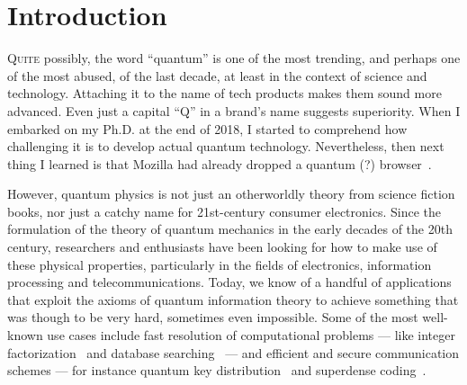 \chapter{Introduction}
\label{chp:intro}

\lettrine{Q}{uite} possibly, the word ``quantum'' is one of the most trending, and perhaps one of
the most abused, of the last decade, at least in the context of science and technology. Attaching it
to the name of tech products makes them sound more advanced. Even just a capital ``Q'' in a brand's
name suggests superiority. When I embarked on my Ph.D. at the end of 2018, I started to comprehend
how challenging it is to develop actual quantum technology. Nevertheless, then next thing I learned
is that Mozilla had already dropped a quantum (?) browser~\cite{firefox_quantum}.

However, quantum physics is not just an otherworldly theory from science fiction books, nor just a
catchy name for 21st-century consumer electronics. Since the formulation of the theory of quantum
mechanics in the early decades of the 20th century, researchers and enthusiasts have been looking
for how to make use of these physical properties, particularly in the fields of electronics,
information processing and telecommunications. Today, we know of a handful of applications that
exploit the axioms of quantum information theory to achieve something that was though to be very
hard, sometimes even impossible. Some of the most well-known use cases include fast resolution of
computational problems --- like integer factorization~\cite{shor_1994_algorithms} and database
searching~\cite{grover_1996_search} --- and efficient and secure communication schemes --- for
instance quantum key distribution~\cite{bennett_2014_bb84, ekert_1991_e91} and superdense
coding~\cite{bennett_1992_communication}.

